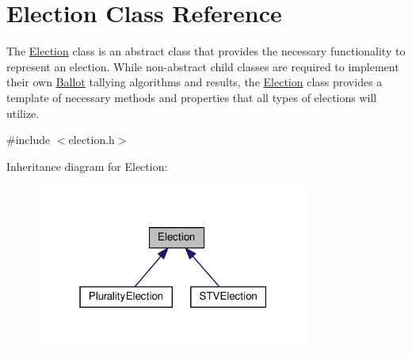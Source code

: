\hypertarget{classElection}{}\section{Election Class Reference}
\label{classElection}


The \hyperlink{classElection}{Election} class is an abstract class that provides the necessary functionality to represent an election. While non-\/abstract child classes are required to implement their own \hyperlink{classBallot}{Ballot} tallying algorithms and results, the \hyperlink{classElection}{Election} class provides a template of necessary methods and properties that all types of elections will utilize.  




{\ttfamily \#include $<$election.\+h$>$}



Inheritance diagram for Election\+:\nopagebreak
\begin{figure}[H]
\begin{center}
\leavevmode
\includegraphics[width=256pt]{classElection__inherit__graph}
\end{center}
\end{figure}
